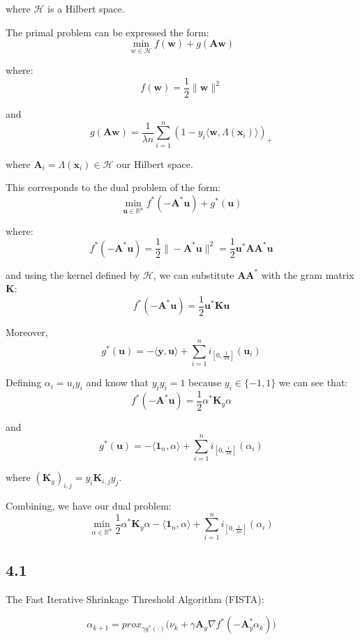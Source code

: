 \documentclass[12pt]{article}
\begin{document}
where $\mathcal{H}$ is a Hilbert space.

The primal problem can be expressed the form:
\[\min_{w \in \mathcal{H}} f(\textbf{w}) + g(\textbf{A}\textbf{w})\]

where:
\[f(\textbf{w}) = \frac{1}{2}\| \textbf{w}\|^2\]

and
\[g(\textbf{A}\textbf{w}) = \frac{1}{\lambda n} \sum_{i=1}^{n} (1-y_i \langle \textbf{w}, \Lambda(\textbf{x}_i)\rangle)_{+}\]

where $\textbf{A}_i = \Lambda(\textbf{x}_i) \in \mathcal{H}$ our Hilbert space.

This corresponds to the dual problem of the form:
\[\min_{\textbf{u} \in \mathbb{R}^{n}} f^*(-\textbf{A}^*\textbf{u}) + g^*(\textbf{u})\]

where:
\[f^*(-\textbf{A}^*\textbf{u}) = \frac{1}{2}\| -\textbf{A}^*\textbf{u}\|^2 = \frac{1}{2} \textbf{u}^*\textbf{A} \textbf{A}^*\textbf{u}\]

and using the kernel defined by $\mathcal{H}$, we can substitute $\textbf{A} \textbf{A}^*$ with the gram matrix $\textbf{K}$:
\[f^*(-\textbf{A}^*\textbf{u}) = \frac{1}{2} \textbf{u}^*\textbf{K}\textbf{u}\]

Moreover,
\[g^*(\textbf{u}) = - \langle \textbf{y}, \textbf{u}\rangle + \sum_{i=1}^{n} i_{\left[0, \frac{1}{\lambda n}\right]}(\textbf{u}_i)\]

Defining $\alpha_i = u_i y_i$ and know that $y_i y_i = 1$ because $y_i \in \{-1, 1\}$ we can see that:
\[f^*(-\textbf{A}^*\textbf{u}) = \frac{1}{2} \alpha^*\textbf{K}_y\alpha\]

and
\[g^*(\textbf{u}) = - \langle \textbf{1}_n, \alpha \rangle + \sum_{i=1}^{n} i_{\left[0, \frac{1}{\lambda n}\right]}(\alpha_i)\]

where $(\textbf{K}_y)_{i, j} = y_i \textbf{K}_{i, j} y_j$.

Combining, we have our dual problem:
\[\min_{\alpha \in \mathbb{R}^n} \frac{1}{2} \alpha^*\textbf{K}_y\alpha - \langle \textbf{1}_n, \alpha \rangle + \sum_{i=1}^{n} i_{\left[0, \frac{1}{\lambda n}\right]}(\alpha_i)\]

\newpage
\subsection*{4.1}

The Fast Iterative Shrinkage Threshold Algorithm (FISTA):

\[\alpha_{k+1} = prox_{\gamma g^*(\cdot)}\bigg(\nu_k + \gamma \textbf{A}_y \nabla f^*(-\textbf{A}_y^* \alpha_{k})\bigg)\]
\end{document}
